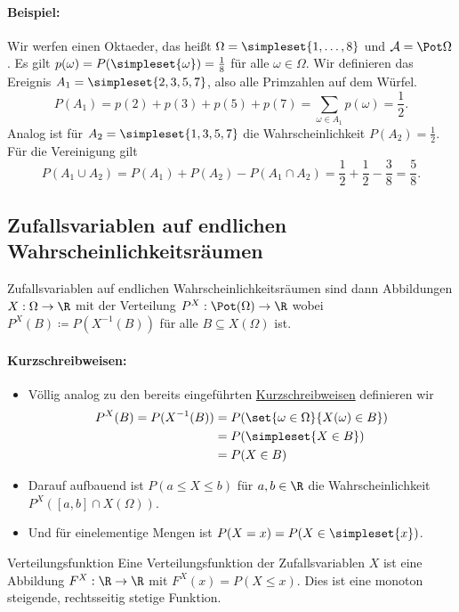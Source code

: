 \paragraph{Beispiel:}
Wir werfen einen Oktaeder, das heißt $\Omega=\simpleset{1,\ldots,8}$ und $\mathcal A=\Pot \Omega$. Es gilt $p(\omega)=P(\simpleset{\omega})=\frac 18$ für alle $\omega \in\Omega$. Wir definieren das Ereignis $A_1=\simpleset{2,3,5,7}$, also alle Primzahlen auf dem Würfel.
\begin{equation*}
	P(A_1)=p(2)+p(3)+p(5)+p(7)=\sum_{\omega\in A_1}p(\omega)=\frac12.
\end{equation*}
Analog ist für $A_2=\simpleset{1,3,5,7}$ die Wahrscheinlichkeit $P(A_2)=\frac12$. Für die Vereinigung gilt
\begin{equation*}
	P(A_1\cup A_2)=P(A_1)+P(A_2)-P(A_1\cap A_2)=\frac12+\frac12-\frac38=\frac58.
\end{equation*}

\subsection{Zufallsvariablen auf endlichen Wahrscheinlichkeitsräumen}
Zufallsvariablen auf endlichen Wahrscheinlichkeitsräumen sind dann Abbildungen $X:\Omega \rightarrow \R$ mit der Verteilung $P^X:\Pot(\Omega)\rightarrow \R$ wobei $P^X(B)\coloneqq P(X^{-1}(B))$ für alle $B\subseteq X(\Omega)$ ist.
\paragraph{Kurzschreibweisen:}
\begin{itemize}
	\item Völlig analog zu den bereits eingeführten \hyperref[Kurzschreibweisen1]{Kurzschreibweisen} definieren wir
		\begin{align*}
		    P^X(B)=P(X^{-1}(B))&=P(\set{\omega\in\Omega}{X(\omega)\in B})\\
		    &=P(\simpleset{X\in B})\\
		    &=P(X\in B)
		\end{align*}
	\item Darauf aufbauend ist $P(a\leq X\leq b)$ für $a,b\in\R$ die Wahrscheinlichkeit $P^X([a,b]\cap X(\Omega))$.
	\item Und für einelementige Mengen ist $P(X=x)=P(X\in \simpleset{x})$.
\end{itemize}

\begin{definition}{Verteilungsfunktion}
	Eine Verteilungsfunktion der Zufallsvariablen $X$ ist eine Abbildung $F^X:\R\rightarrow\R$ mit $F^X(x)=P(X\leq x)$. Dies ist eine monoton steigende, rechtsseitig stetige Funktion.
\end{definition}


